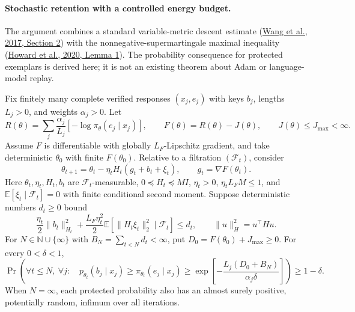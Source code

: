 \paragraph{Stochastic retention with a controlled energy budget.}
The argument combines a standard variable-metric descent estimate
(\href{https://doi.org/10.1137/15M1053141}{Wang et al., 2017, Section 2})
with the nonnegative-supermartingale maximal inequality
(\href{https://doi.org/10.1214/18-PS321}{Howard et al., 2020, Lemma 1}).
The probability consequence for protected exemplars is derived here; it is
not an existing theorem about Adam or language-model replay.

\begin{theorem}
Fix finitely many complete verified responses $(x_j,e_j)$ with keys $b_j$,
lengths $L_j>0$, and weights $\alpha_j>0$. Let
\[
 R(\theta)=\sum_j\frac{\alpha_j}{L_j}
             [-\log\pi_\theta(e_j\mid x_j)],\qquad
 F(\theta)=R(\theta)-J(\theta),\qquad J(\theta)\le J_{\max}<\infty.
\]
Assume $F$ is differentiable with globally $L_F$-Lipschitz gradient,
and take deterministic $\theta_0$ with finite $F(\theta_0)$. Relative to a filtration
$(\mathcal F_t)$, consider
\[
 \theta_{t+1}=\theta_t-\eta_t H_t(g_t+b_t+\xi_t),\qquad
 g_t=\nabla F(\theta_t).
\]
Here $\theta_t,\eta_t,H_t,b_t$ are $\mathcal F_t$-measurable,
$0\preceq H_t\preceq MI$, $\eta_t>0$, $\eta_tL_FM\le1$, and
$\mathbb E[\xi_t\mid\mathcal F_t]=0$ with finite conditional second moment.
Suppose deterministic numbers $d_t\ge0$ bound
\[
 \frac{\eta_t}{2}\|b_t\|_{H_t}^2
 +\frac{L_F\eta_t^2}{2}
       \mathbb E[\|H_t\xi_t\|_2^2\mid\mathcal F_t]\le d_t,
 \qquad \|u\|_H^2=u^\top Hu.
\]
For $N\in\mathbb N\cup\{\infty\}$ with
$B_N=\sum_{t<N}d_t<\infty$, put
$D_0=F(\theta_0)+J_{\max}\ge0$. For every $0<\delta<1$,
\[
 \Pr\!\left(
  \forall t\le N,\ \forall j:\quad
  p_{\theta_t}(b_j\mid x_j)
  \ge\pi_{\theta_t}(e_j\mid x_j)
  \ge\exp\!\left[-\frac{L_j(D_0+B_N)}{\alpha_j\delta}\right]
 \right)\ge1-\delta.
\]
When $N=\infty$, each protected probability also has an almost surely
positive, potentially random, infimum over all iterations.
\end{theorem}


